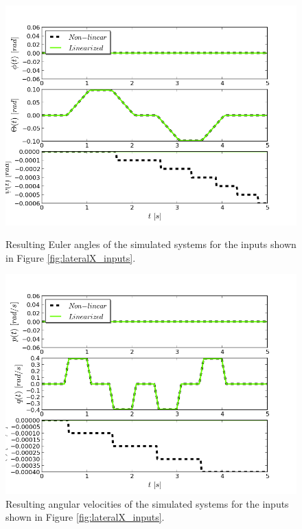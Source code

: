 \begin{figure}[h!]
\centering
\includegraphics[scale=0.7]{Images/Chapter3/Lateral_X/Euler_Angles.png}
\caption{Resulting Euler angles of the simulated systems for the inputs shown in Figure \ref{fig:lateralX_inputs}.}
\label{fig:LateralX_Euler}

\includegraphics[scale=0.7]{Images/Chapter3/Lateral_X/Angular_velocities.png}
\caption{Resulting angular velocities of the simulated systems for the inputs shown in Figure \ref{fig:lateralX_inputs}.}
\label{fig:LateralX_angvelocities}
\end{figure}

